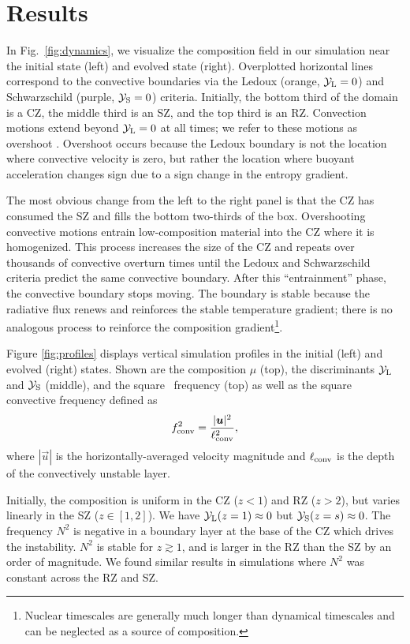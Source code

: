 \section{Results}
\label{sec:results}

In Fig.~\ref{fig:dynamics}, we visualize the composition field in our simulation near the initial state (left) and evolved state (right).
Overplotted horizontal lines correspond to the convective boundaries via the Ledoux (orange, $\mathcal{Y}_{\rm{L}} = 0$) and Schwarzschild (purple, $\mathcal{Y}_{\rm{S}}=0$) criteria.
Initially, the bottom third of the domain is a CZ, the middle third is an SZ, and the top third is an RZ.
Convection motions extend beyond $\mathcal{Y}_{\rm{L}} = 0$ at all times; we refer to these motions as overshoot \citep[which is discussed in][]{korre_etal_2019}.
Overshoot occurs because the Ledoux boundary is not the location where convective velocity is zero, but rather the location where buoyant acceleration changes sign due to a sign change in the entropy gradient.

The most obvious change from the left to the right panel is that the CZ has consumed the SZ and fills the bottom two-thirds of the box.
Overshooting convective motions entrain low-composition material into the CZ where it is homogenized.
This process increases the size of the CZ and repeats over thousands of convective overturn times until the Ledoux and Schwarzschild criteria predict the same convective boundary.
After this ``entrainment'' phase, the convective boundary stops moving.
The boundary is stable because the radiative flux renews and reinforces the stable temperature gradient; there is no analogous process to reinforce the composition gradient\footnote{Nuclear timescales are generally much longer than dynamical timescales and can be neglected as a source of composition.}.

Figure \ref{fig:profiles} displays vertical simulation profiles in the initial (left) and evolved (right) states.
Shown are the composition $\mu$ (top), the discriminants $\mathcal{Y}_{\rm{L}}$ and $\mathcal{Y}_{\rm{S}}$ (middle), and the square \brunt$\,$ frequency (top) as well as the square convective frequency defined as
\begin{equation}
f_{\rm{conv}}^2 = \frac{|\vec{u}|^2}{\ell_{\rm{conv}}^2},
\label{eqn:fconv2}
\end{equation}
where $|\vec{u}|$ is the horizontally-averaged velocity magnitude and $\ell_{\rm{conv}}$ is the depth of the convectively unstable layer.

Initially, the composition is uniform in the CZ ($z < 1$) and RZ ($z > 2$), but varies linearly in the SZ ($z \in [1, 2]$).
We have $\mathcal{Y}_{\rm{L}}(z=1) \approx 0$ but $\mathcal{Y}_{\rm{S}}(z=s) \approx 0$.
The \brunt$\,$ frequency $N^2$ is negative in a boundary layer at the base of the CZ which drives the instability.
$N^2$ is stable for $z \gtrsim 1$, and is larger in the RZ than the SZ by an order of magnitude.
We found similar results in simulations where $N^2$ was constant across the RZ and SZ.

